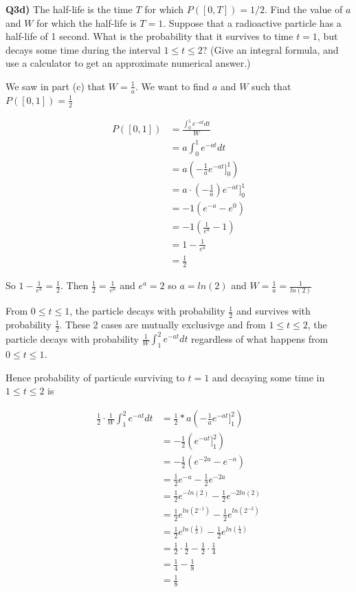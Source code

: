\documentclass[9pt]{article}
\begin{document}
\begin{tcolorbox}
  \textbf{Q3d)} The half-life is the time $T$ for which $P([0, T]) = 1/2$. Find the value of $a$ and $W$ for which the half-life is $T = 1$. Suppose that a radioactive particle has a half-life of 1 second. What is the probability that it survives to time $t = 1$, but decays some time during the interval $1 \leq t \leq 2$? (Give an integral formula, and use a calculator to get an approximate numerical answer.)
\end{tcolorbox}

We saw in part (c) that $W = \frac{1}{a}$. We want to find $a$ and $W$ such that $P([0, 1]) = \frac{1}{2}$

\begin{align*}
  P([0, 1]) &= \frac{\int_0^1 e^{-at} dt}{W} \\
  &= a \int_0^1 e^{-at} dt \\
  &= a(-\frac{1}{a} e^{-at} \bigg]_0^1) \\
  &= a \cdot (-\frac{1}{a}) e^{-at} \bigg]_0^1 \\
  &= -1(e^{-a} - e^0) \\
  &= -1(\frac{1}{e^a} - 1) \\
  &= 1 - \frac{1}{e^a} \\
  &= \frac{1}{2}
\end{align*}

So $1 - \frac{1}{e^a} = \frac{1}{2}$. Then $\frac{1}{2} = \frac{1}{e^a}$ and $e^a = 2$ so $a = ln(2)$ and $W = \frac{1}{a} = \frac{1}{ln(2)}$

From $0 \leq t \leq 1$, the particle decays with probability $\frac{1}{2}$ and survives with probability $\frac{1}{2}$. These 2 cases are mutually exclusivge and from $1 \leq t \leq 2$, the particle decays with probability $\frac{1}{W} \int_1^2 e^{-at} dt$ regardless of what happens from $0 \leq t \leq 1$.

Hence probability of particule surviving to $t = 1$ and decaying some time in $1 \leq t \leq 2$ is

\begin{align*}
  \frac{1}{2} \cdot \frac{1}{W} \int_1^2 e^{-at} dt &= \frac{1}{2} * a(-\frac{1}{a} e^{-at} \bigg]_1^2) \\
  &= -\frac{1}{2} (e^{-at} \bigg]_1^2) \\
  &= -\frac{1}{2} (e^{-2a} - e^{-a}) \\
  &= \frac{1}{2} e^{-a} - \frac{1}{2} e^{-2a} \\
  &= \frac{1}{2} e^{-ln(2)} - \frac{1}{2} e^{-2ln(2)} \\
  &= \frac{1}{2} e^{ln(2^{-1})} - \frac{1}{2} e^{ln(2^{-2})} \\
  &= \frac{1}{2} e^{ln(\frac{1}{2})} - \frac{1}{2} e^{ln(\frac{1}{4})} \\
  &= \frac{1}{2} \cdot \frac{1}{2} - \frac{1}{2} \cdot \frac{1}{4} \\
  &= \frac{1}{4} - \frac{1}{8} \\
  &= \frac{1}{8}
\end{align*}
\end{document}
